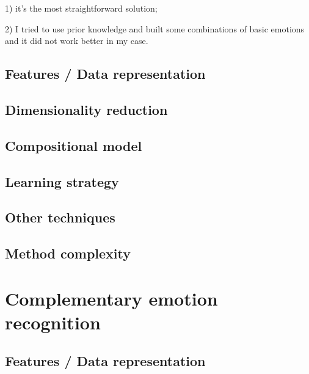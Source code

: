 \documentclass{article}
\begin{document}
1) it's the most straightforward solution;

2) I tried to use prior knowledge and built some combinations of basic emotions and it did not work better in my case.

\subsection{Features / Data representation}

\subsection{Dimensionality reduction}

\subsection{Compositional model}

\subsection{Learning strategy}

\subsection{Other techniques}

\subsection{Method complexity}


\section{Complementary emotion recognition}
\subsection{Features / Data representation}
\end{document}
